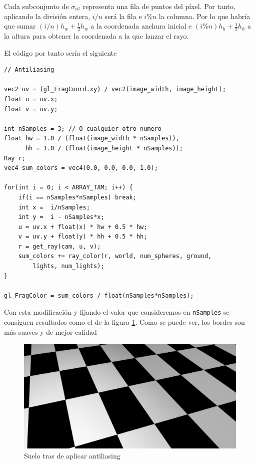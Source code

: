 Cada subconjunto de $\sigma_{n^2}$ representa una fila de puntos del píxel. Por tanto, aplicando la división entera, $i/n$ será la fila e $i\%n$ la columna. Por lo que habría que sumar $(i/n)h_w + \frac{1}{2}h_w$ a la coordenada anchura inicial e $(i\%n)h_h+ \frac{1}{2}h_h$ a la altura para obtener la coordenada a la que lanzar el rayo.

El código por tanto sería el siguiente

\begin{lstlisting}
// Antiliasing

vec2 uv = (gl_FragCoord.xy) / vec2(image_width, image_height);
float u = uv.x;
float v = uv.y;

int nSamples = 3; // O cualquier otro numero
float hw = 1.0 / (float(image_width * nSamples)),
      hh = 1.0 / (float(image_height * nSamples));
Ray r;
vec4 sum_colors = vec4(0.0, 0.0, 0.0, 1.0);

for(int i = 0; i < ARRAY_TAM; i++) {
    if(i == nSamples*nSamples) break;
    int x =  i/nSamples;
    int y =  i - nSamples*x;
    u = uv.x + float(x) * hw + 0.5 * hw;
    v = uv.y + float(y) * hh + 0.5 * hh;
    r = get_ray(cam, u, v);
    sum_colors += ray_color(r, world, num_spheres, ground, 
        lights, num_lights);
}

gl_FragColor = sum_colors / float(nSamples*nSamples);
\end{lstlisting}

Con esta modificación y fijando el valor que consideremos en \verb|nSamples| se consiguen resultados como el de la figura \ref{fig:antiliasing}. Como se puede ver, los bordes son más suaves y de mejor calidad

\begin{figure} [ht]
    \centering
    \includegraphics[scale = 0.5]{img/C7/antiliasing.png}
    \caption{Suelo tras de aplicar antiliasing}
    \label{fig:antiliasing}
\end{figure}

